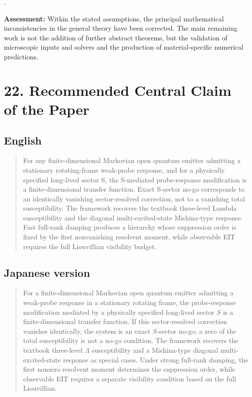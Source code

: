 \documentclass[
  10pt,
  a4paper,
]{article}
\begin{document}
.

\textbf{Assessment:} Within the stated assumptions, the principal
mathematical inconsistencies in the general theory have been corrected.
The main remaining work is not the addition of further abstract
theorems, but the validation of microscopic inputs and solvers and the
production of material-specific numerical predictions.

\section{22. Recommended Central Claim of the
Paper}\label{recommended-central-claim-of-the-paper}

\subsection{English}\label{english}

\begin{quote}
For any finite-dimensional Markovian open quantum emitter admitting a
stationary rotating-frame weak-probe response, and for a physically
specified long-lived sector S, the S-mediated probe-response
modification is a finite-dimensional transfer function. Exact S-sector
no-go corresponds to an identically vanishing sector-resolved
correction, not to a vanishing total susceptibility. The framework
recovers the textbook three-level Lambda susceptibility and the diagonal
multi-excited-state Mishina-type response. Fast full-rank damping
produces a hierarchy whose suppression order is fixed by the first
nonvanishing resolvent moment, while observable EIT requires the full
Liouvillian visibility budget.
\end{quote}

\subsection{Japanese version}\label{japanese-version}

\begin{quote}
For a finite-dimensional Markovian open quantum emitter admitting a
weak-probe response in a stationary rotating frame, the probe-response
modification mediated by a physically specified long-lived sector \(S\)
is a finite-dimensional transfer function. If this sector-resolved
correction vanishes identically, the system is an exact \(S\)-sector
no-go; a zero of the total susceptibility is not a no-go condition. The
framework recovers the textbook three-level \(\Lambda\) susceptibility
and a Mishina-type diagonal multi-excited-state response as special
cases. Under strong full-rank damping, the first nonzero resolvent
moment determines the suppression order, while observable EIT requires a
separate visibility condition based on the full Liouvillian.
\end{quote}
\end{document}
